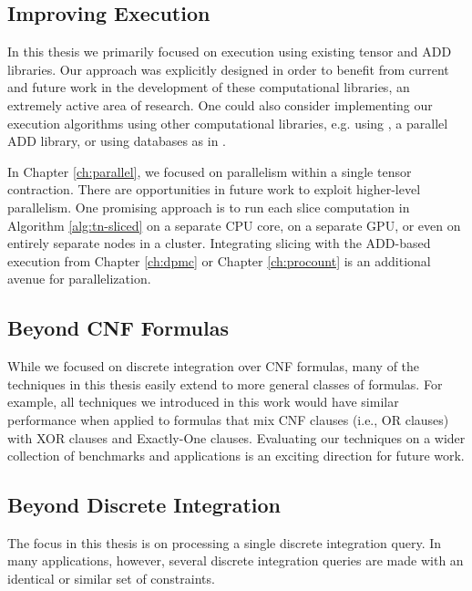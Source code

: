 \subsection{Improving Execution}
In this thesis we primarily focused on execution using existing tensor and ADD libraries.
Our approach was explicitly designed in order to benefit from current and future work in the development of these computational libraries, an extremely active area of research.
One could also consider implementing our execution algorithms using other computational libraries, e.g. using \sylvan{} \cite{van2015sylvan}, a parallel ADD library, or using databases as in \cite{fichte2020exploiting}.

In Chapter \ref{ch:parallel}, we focused on parallelism within a single tensor contraction.
There are opportunities in future work to exploit higher-level parallelism. 
One promising approach is to run each slice computation in Algorithm \ref{alg:tn-sliced} on a separate CPU core, on a separate GPU, or even on entirely separate nodes in a cluster. %
Integrating slicing with the ADD-based execution from Chapter \ref{ch:dpmc} or Chapter \ref{ch:procount} is an additional avenue for parallelization.


\subsection{Beyond CNF Formulas}
While we focused on discrete integration over CNF formulas, many of the techniques in this thesis easily extend to more general classes of formulas.
For example, all techniques we introduced in this work would have similar performance when applied to formulas that mix CNF clauses (i.e., OR clauses) with XOR clauses and Exactly-One clauses. %
Evaluating our techniques on a wider collection of benchmarks and applications is an exciting direction for future work.


\subsection{Beyond Discrete Integration}
The focus in this thesis is on processing a single discrete integration query. 
In many applications, however, several discrete integration queries are made with an identical or similar set of constraints.

